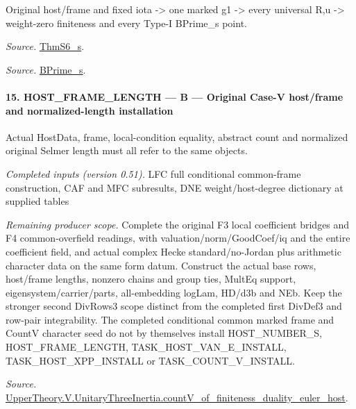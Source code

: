 \documentclass[11pt,a4paper]{article}
\numberwithin{equation}{section}
\theoremstyle{remark}\newtheorem{remark}[theorem]{Remark}
\begin{document}
Original host/frame and fixed iota -> one marked g1 -> every universal R,u -> weight-zero finiteness and every Type-I BPrime\_\allowbreak s point.

\emph{Source.} \href{https://github.com/CocoSgt/riemann-hypothesis-lean/blob/7cbf7a0c32fca1badf05931879a37c3f8a2b03b4/src/Development/AutomorphicArithmetic/AutomorphicVarieties/ModularityArgument/ThresholdArguments/DenseThresholdCases/ThmS6CoreS.lean#L17-L26}{ThmS6\_\allowbreak s}.

\emph{Source.} \href{https://github.com/CocoSgt/riemann-hypothesis-lean/blob/7cbf7a0c32fca1badf05931879a37c3f8a2b03b4/src/Development/AutomorphicArithmetic/AutomorphicVarieties/ModularityArgument/ThresholdArguments/DenseThresholdCases/ThmS6CoreS.lean#L12-L16}{BPrime\_\allowbreak s}.



\paragraph{15. HOST\_\allowbreak FRAME\_\allowbreak LENGTH — B — Original Case-V host/frame and normalized-length installation}

Actual HostData, frame, local-condition equality, abstract count and normalized original Selmer length must all refer to the same objects.

\emph{Completed inputs (version 0.51).} LFC full conditional common-frame construction, CAF and MFC subresults, DNE weight/host-degree dictionary at supplied tables

\emph{Remaining producer scope.} Complete the original F3 local coefficient bridges and F4 common-overfield readings, with valuation/norm/GoodCoef/iq and the entire coefficient field, and actual complex Hecke standard/no-Jordan plus arithmetic character data on the same form datum. Construct the actual base rows, host/frame lengths, nonzero chains and group ties, MultEq support, eigensystem/carrier/parts, all-embedding logLam, HD/d3b and NEb. Keep the stronger second DivRows3 scope distinct from the completed first DivDef3 and row-pair integrability. The completed conditional common marked frame and CountV character seed do not by themselves install HOST\_\allowbreak NUMBER\_\allowbreak S, HOST\_\allowbreak FRAME\_\allowbreak LENGTH, TASK\_\allowbreak HOST\_\allowbreak VAN\_\allowbreak E\_\allowbreak INSTALL, TASK\_\allowbreak HOST\_\allowbreak XPP\_\allowbreak INSTALL or TASK\_\allowbreak COUNT\_\allowbreak V\_\allowbreak INSTALL.

\emph{Source.} \href{https://github.com/CocoSgt/riemann-hypothesis-lean/blob/7cbf7a0c32fca1badf05931879a37c3f8a2b03b4/src/Development/AutomorphicArithmetic/AutomorphicVarieties/ModularityArgument/ThresholdArguments/DenseThresholdCases/CountVOf.lean#L33-L60}{UpperTheory.V.UnitaryThreeInertia.countV\_\allowbreak of\_\allowbreak finiteness\_\allowbreak duality\_\allowbreak euler\_\allowbreak host}.
\end{document}
